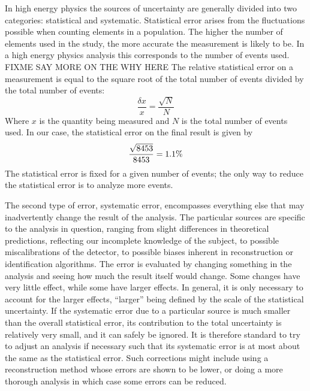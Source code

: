 In high energy physics the sources of uncertainty 
are generally divided into two categories: 
statistical and systematic.  
Statistical error arises from the fluctuations 
possible when counting elements in a population.  
The higher the number of elements used 
in the study, 
the more accurate the measurement is likely to be.  
In a high energy physics analysis 
this corresponds to the number of events used.  
FIXME SAY MORE ON THE WHY HERE 
The relative statistical error on a measurement 
is equal to the square root of the total number 
of events divided by the total number of events:
\[
\frac{\delta{}x}{x} = \frac{\sqrt{N}}{N}
\]
Where $x$ is the quantity being measured and 
$N$ is the total number of events used.  
In our case, the statistical error on the final 
result is given by 
\[
\frac{\sqrt{\nevents{}}}{\nevents{}} = 1.1\% %
\]
The statistical error is fixed for a given number 
of events; 
the only way to reduce the statistical error 
is to analyze more events.  

The second type of error, systematic error, 
encompasses everything else that may 
inadvertently change the result of the analysis.  
The particular sources are specific to the analysis 
in question, 
ranging from slight differences 
in theoretical predictions, 
reflecting our incomplete knowledge of the subject, 
to possible miscalibrations of the detector, 
to possible biases inherent in reconstruction 
or identification algorithms.  
The error is evaluated by changing something 
in the analysis and seeing how much the 
result itself would change.  
Some changes have very little effect, 
while some have larger effects.  
In general, it is only necessary to account 
for the larger effects, 
``larger'' being defined by the scale 
of the statistical uncertainty.  
If the systematic error due to a particular 
source is much smaller than the 
overall statistical error, 
its contribution to the total uncertainty 
is relatively very small, 
and it can safely be ignored.  
It is therefore standard to try to adjust 
an analysis if necessary such that its 
systematic error is at most about the same as 
the statistical error.  
Such corrections might include using 
a reconstruction method whose errors 
are shown to be lower, 
or doing a more thorough analysis 
in which case some errors can be reduced.  




